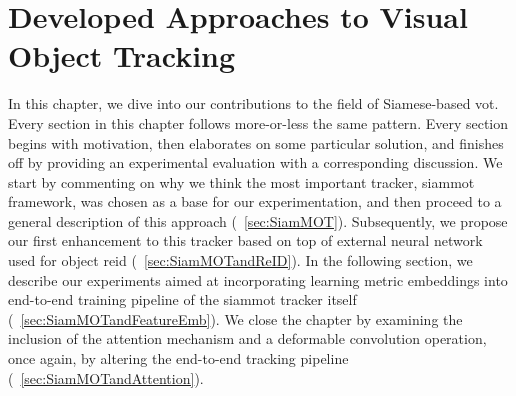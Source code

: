 \chapter{Developed Approaches to Visual Object Tracking}
\label{chap:DevelopedVisualTrackingApproaches}

In this chapter, we dive into our contributions to the field of Siamese-based \gls{vot}. Every section in this chapter follows more-or-less the same pattern. Every section begins with motivation, then elaborates on some particular solution, and finishes off by providing an experimental evaluation with a corresponding discussion. We start by commenting on why we think the most important tracker, \gls{siammot} framework, was chosen as a base for our experimentation, and then proceed to a general description of this approach (\sectiontext{}~\ref{sec:SiamMOT}). Subsequently, we propose our first enhancement to this tracker based on top of external neural network used for object \gls{reid} (\sectiontext{}~\ref{sec:SiamMOTandReID}). In the following section, we describe our experiments aimed at incorporating learning metric embeddings into end-to-end training pipeline of the \gls{siammot} tracker itself (\sectiontext{}~\ref{sec:SiamMOTandFeatureEmb}). We close the chapter by examining the inclusion of the attention mechanism and a deformable convolution operation, once again, by altering the end-to-end tracking pipeline (\sectiontext{}~\ref{sec:SiamMOTandAttention}).





